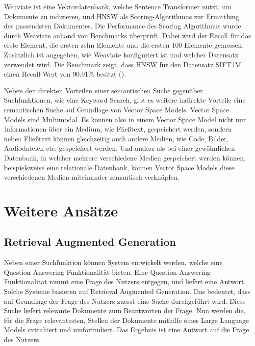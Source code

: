 
Weaviate ist eine Vektordatenbank, welche Sentence Transformer nutzt, um Dokumente zu indizieren, und HNSW als Scoring-Algorithmus zur Ermittlung des passendsten Dokumentes.
Die Performance des Scoring Algorithmus wurde durch Weaviate anhand von Benchmarks überprüft.
Dabei wird der Recall für das erste Element, die ersten zehn Elemente und die ersten 100 Elemente gemessen.
Zusätzlich ist angegeben, wie Weaviate konfiguriert ist und welcher Datensatz verwendet wird.
Die Benchmark zeigt, dass HNSW für den Datensatz SIFT1M einen Recall-Wert von 90.91\% besitzt (\cite{Weaviate_Benchmark}).

Neben den direkten Vorteilen einer semantischen Suche gegenüber Suchfunktionen, wie eine Keyword Search, gibt es weitere indirekte Vorteile eine semantischen Suche auf Grundlage von Vector Space Models.
Vector Space Models sind Multimodal.
Es können also in einem Vector Space Model nicht nur Informationen über ein Medium, wie Fließtext, gespeichert werden, sondern neben Fließtext können gleichzeitig auch andere Medien, wie Code, Bilder, Audiodateien etc. gespeichert werden.
Und anders als bei einer gewöhnlichen Datenbank, in welcher mehrere verschiedene Medien gespeichert werden können, beispielsweise eine relationale Datenbank, können Vector Space Models diese verschiedenen Medien miteinander semantisch verknüpfen.\\

\section{Weitere Ansätze}

\subsection{Retrieval Augmented Generation}
Neben einer Suchfunktion können System entwickelt werden, welche eine Question-Answering Funktionalität bieten.
Eine Question-Answering Funktionalität nimmt eine Frage des Nutzers entgegen, und liefert eine Antwort.
Solche Systeme basieren auf Retrieval Augmented Generation.
Das bedeutet, dass auf Grundlage der Frage des Nutzers zuerst eine Suche durchgeführt wird.
Diese Suche liefert relevante Dokumente zum Beantworten der Frage.
Nun werden die, für die Frage relevantesten, Stellen der Dokumente mithilfe eines Large Language Models extrahiert und umformuliert.
Das Ergebnis ist eine Antwort auf die Frage des Nutzers. 

